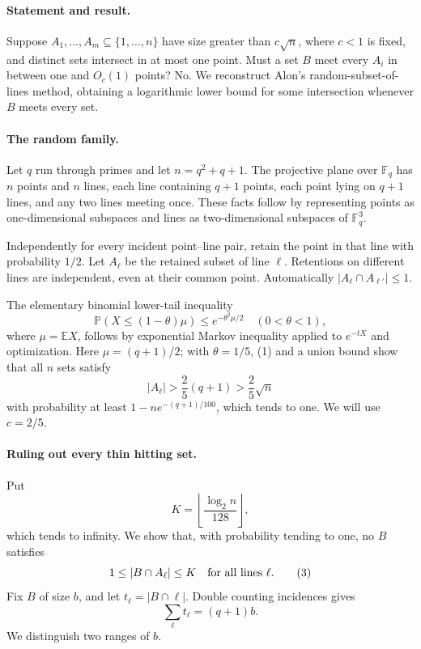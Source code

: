 \paragraph{Statement and result.}
Suppose \(A_1,\ldots,A_m\subseteq\{1,\ldots,n\}\) have size greater than \(c\sqrt n\), where \(c<1\) is fixed, and distinct sets intersect in at most one point. Must a set \(B\) meet every \(A_i\) in between one and \(O_c(1)\) points? No. We reconstruct Alon's random-subset-of-lines method, obtaining a logarithmic lower bound for some intersection whenever \(B\) meets every set.

\paragraph{The random family.}
Let \(q\) run through primes and let \(n=q^2+q+1\). The projective plane over \(\mathbb F_q\) has \(n\) points and \(n\) lines, each line containing \(q+1\) points, each point lying on \(q+1\) lines, and any two lines meeting once. These facts follow by representing points as one-dimensional subspaces and lines as two-dimensional subspaces of \(\mathbb F_q^3\).

Independently for every incident point--line pair, retain the point in that line with probability \(1/2\). Let \(A_\ell\) be the retained subset of line \(\ell\). Retentions on different lines are independent, even at their common point. Automatically \(|A_\ell\cap A_{\ell'}|\leq1\).

The elementary binomial lower-tail inequality
\[
 \mathbb P(X\leq(1-\theta)\mu)\leq e^{-\theta^2\mu/2}
 \quad(0<\theta<1), \tag{1}
\]
where \(\mu=\mathbb E X\), follows by exponential Markov inequality applied to \(e^{-tX}\) and optimization. Here \(\mu=(q+1)/2\); with \(\theta=1/5\), (1) and a union bound show that all \(n\) sets satisfy
\[
 |A_\ell|>\frac25(q+1)>\frac25\sqrt n \tag{2}
\]
with probability at least \(1-ne^{-(q+1)/100}\), which tends to one. We will use \(c=2/5\).

\paragraph{Ruling out every thin hitting set.}
Put
\[
 K=\left\lfloor\frac{\log_2 n}{128}\right\rfloor,
\]
which tends to infinity. We show that, with probability tending to one, no \(B\) satisfies
\[
 1\leq |B\cap A_\ell|\leq K\quad\hbox{for all lines }\ell. \tag{3}
\]
Fix \(B\) of size \(b\), and let \(t_\ell=|B\cap\ell|\). Double counting incidences gives
\[
 \sum_\ell t_\ell=(q+1)b. \tag{4}
\]
We distinguish two ranges of \(b\).

